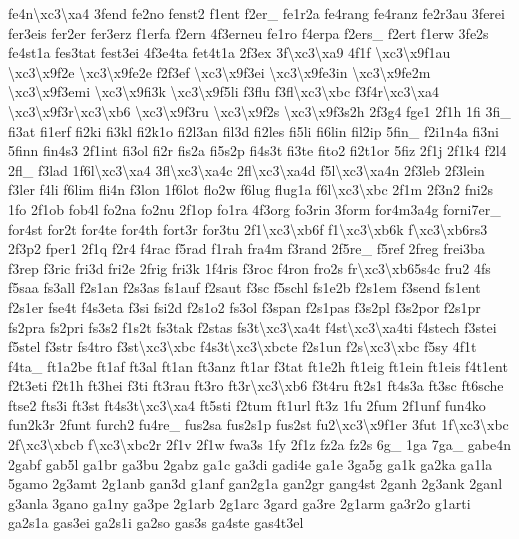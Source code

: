 {fe4n\textbackslash{}xc3\textbackslash{}xa4 3fend fe2no fenst2 f1ent f2er\-\_\- fe1r2a fe4rang fe4ranz fe2r3au 3ferei fer3eis fer2er fer3erz f1erfa f2ern 4f3erneu fe1ro f4erpa f2ers\-\_\- f2ert f1erw 3fe2s fe4st1a fes3tat fest3ei 4f3e4ta fet4t1a 2f3ex 3f\textbackslash{}xc3\textbackslash{}xa9 4f1f \textbackslash{}xc3\textbackslash{}x9f1au \textbackslash{}xc3\textbackslash{}x9f2e \textbackslash{}xc3\textbackslash{}x9fe2e f2f3ef \textbackslash{}xc3\textbackslash{}x9f3ei \textbackslash{}xc3\textbackslash{}x9fe3in \textbackslash{}xc3\textbackslash{}x9fe2m \textbackslash{}xc3\textbackslash{}x9f3emi \textbackslash{}xc3\textbackslash{}x9fi3k \textbackslash{}xc3\textbackslash{}x9f5li f3flu f3fl\textbackslash{}xc3\textbackslash{}xbc f3f4r\textbackslash{}xc3\textbackslash{}xa4 \textbackslash{}xc3\textbackslash{}x9f3r\textbackslash{}xc3\textbackslash{}xb6 \textbackslash{}xc3\textbackslash{}x9f3ru \textbackslash{}xc3\textbackslash{}x9f2s \textbackslash{}xc3\textbackslash{}x9f3s2h 2f3g4 fge1 2f1h 1fi 3fi\-\_\- fi3at fi1erf fi2ki fi3kl fi2k1o fi2l3an fil3d fi2les fi5li fi6lin fil2ip 5fin\-\_\- f2i1n4a fi3ni 5finn fin4s3 2f1int fi3ol fi2r fis2a fi5s2p fi4s3t fi3te fito2 fi2t1or 5fiz 2f1j 2f1k4 f2l4 2fl\-\_\- f3lad 1f6l\textbackslash{}xc3\textbackslash{}xa4 3fl\textbackslash{}xc3\textbackslash{}xa4c 2fl\textbackslash{}xc3\textbackslash{}xa4d f5l\textbackslash{}xc3\textbackslash{}xa4n 2f3leb 2f3lein f3ler f4li f6lim fli4n f3lon 1f6lot flo2w f6lug flug1a f6l\textbackslash{}xc3\textbackslash{}xbc 2f1m 2f3n2 fni2s 1fo 2f1ob fob4l fo2na fo2nu 2f1op fo1ra 4f3org fo3rin 3form for4m3a4g forni7er\-\_\- for4st for2t for4te for4th fort3r for3tu 2f1\textbackslash{}xc3\textbackslash{}xb6f f1\textbackslash{}xc3\textbackslash{}xb6k f\textbackslash{}xc3\textbackslash{}xb6rs3 2f3p2 fper1 2f1q f2r4 f4rac f5rad f1rah fra4m f3rand 2f5re\-\_\- f5ref 2freg frei3ba f3rep f3ric fri3d fri2e 2frig fri3k 1f4ris f3roc f4ron fro2s fr\textbackslash{}xc3\textbackslash{}xb65s4c fru2 4fs f5saa fs3all f2s1an f2s3as fs1auf f2saut f3sc f5schl fs1e2b f2s1em f3send fs1ent f2s1er fse4t f4s3eta f3si fsi2d f2s1o2 fs3ol f3span f2s1pas f3s2pl f3s2por f2s1pr fs2pra fs2pri fs3s2 f1s2t fs3tak f2stas fs3t\textbackslash{}xc3\textbackslash{}xa4t f4st\textbackslash{}xc3\textbackslash{}xa4ti f4stech f3stei f5stel f3str fs4tro f3st\textbackslash{}xc3\textbackslash{}xbc f4s3t\textbackslash{}xc3\textbackslash{}xbcte f2s1un f2s\textbackslash{}xc3\textbackslash{}xbc f5sy 4f1t f4ta\-\_\- ft1a2be ft1af ft3al ft1an ft3anz ft1ar f3tat ft1e2h ft1eig ft1ein ft1eis f4t1ent f2t3eti f2t1h ft3hei f3ti ft3rau ft3ro ft3r\textbackslash{}xc3\textbackslash{}xb6 f3t4ru ft2s1 ft4s3a ft3sc ft6sche ftse2 fts3i ft3st ft4s3t\textbackslash{}xc3\textbackslash{}xa4 ft5sti f2tum ft1url ft3z 1fu 2fum 2f1unf fun4ko fun2k3r 2funt furch2 fu4re\-\_\- fus2sa fus2s1p fus2st fu2\textbackslash{}xc3\textbackslash{}x9f1er 3fut 1f\textbackslash{}xc3\textbackslash{}xbc 2f\textbackslash{}xc3\textbackslash{}xbcb f\textbackslash{}xc3\textbackslash{}xbc2r 2f1v 2f1w fwa3s 1fy 2f1z fz2a fz2s 6g\-\_\- 1ga 7ga\-\_\- gabe4n 2gabf gab5l ga1br ga3bu 2gabz ga1c ga3di gadi4e ga1e 3ga5g ga1k ga2ka ga1la 5gamo 2g3amt 2g1anb gan3d g1anf gan2g1a gan2gr gang4st 2ganh 2g3ank 2ganl g3anla 3gano ga1ny ga3pe 2g1arb 2g1arc 3gard ga3re 2g1arm ga3r2o g1arti ga2s1a gas3ei ga2s1i ga2so gas3s ga4ste gas4t3el }
